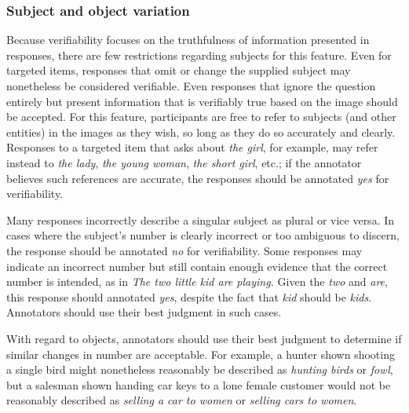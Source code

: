 \documentclass[12pt]{article}
\begin{document}
\subsubsection{Subject and object variation} Because verifiability focuses on the truthfulness of information presented in responses, there are few restrictions regarding subjects for this feature. Even for targeted items, responses that omit or change the supplied subject may nonetheless be considered verifiable. Even responses that ignore the question entirely but present information that is verifiably true based on the image should be accepted. For this feature, participants are free to refer to subjects (and other entities) in the images as they wish, so long as they do so accurately and clearly. Responses to a targeted item that asks about \textit{the girl}, for example, may refer instead to \textit{the lady}, \textit{the young woman}, \textit{the short girl}, etc.; if the annotator believes such references are accurate, the responses should be annotated \textit{yes} for verifiability.

Many responses incorrectly describe a singular subject as plural or vice versa. In cases where the subject's number is clearly incorrect or too ambiguous to discern, the response should be annotated \textit{no} for verifiability. Some responses may indicate an incorrect number but still contain enough evidence that the correct number is intended, as in \textit{The two little kid are playing.} Given the \textit{two} and \textit{are}, this response should annotated \textit{yes}, despite the fact that \textit{kid} should be \textit{kids}. Annotators should use their best judgment in such cases.

With regard to objects, annotators should use their best judgment to determine if similar changes in number are acceptable. For example, a hunter shown shooting a single bird might nonetheless reasonably be described as \textit{hunting birds} or \textit{fowl}, but a salesman shown handing car keys to a lone female customer would not be reasonably described as \textit{selling a car to women} or \textit{selling cars to women}.
\end{document}
